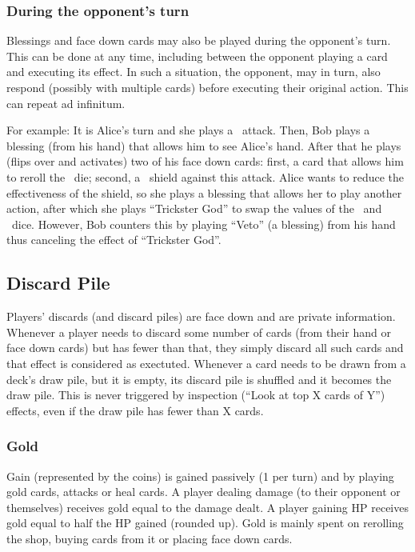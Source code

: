 \documentclass[dvipsnames,parskip,a4paper]{scrartcl}
\newcommand{\iconsize}{3.4mm}
\newcommand{\icondepth}{0.45mm}
\newcommand{\icon}[1]{\raisebox{-\icondepth}{\texttt{[image:  \#1 ]}}}
\newcommand{\fire}{\icon{icons/fire.png}}
\newcommand{\water}{\icon{icons/water.png}}
\begin{document}
\subsubsection*{During the opponent's turn}

Blessings and face down cards may also be played during the opponent's turn. This can be done at any time, including between the opponent playing a card and executing its effect. In such a situation, the opponent, may in turn, also respond (possibly with multiple cards) before executing their original action. This can repeat ad infinitum.

For example: It is Alice's turn and she plays a \fire \ attack. Then, Bob plays a blessing (from his hand) that allows him to see Alice's hand. After that he plays (flips over and activates) two of his face down cards: first, a card that allows him to reroll the \fire \ die; second, a \water \ shield against this attack. Alice wants to reduce the effectiveness of the shield, so she plays a blessing that allows her to play another action, after which she plays ``Trickster God'' to swap the values of the \fire \ and \water \ dice. However, Bob counters this by playing ``Veto'' (a blessing) from his hand thus canceling the effect of ``Trickster God''.

\subsection*{Discard Pile}

Players' discards (and discard piles) are face down and are private information. Whenever a player needs to discard some number of cards (from their hand or face down cards) but has fewer than that, they simply discard all such cards and that effect is considered as exectuted. Whenever a card needs to be drawn from a deck's draw pile, but it is empty, its discard pile is shuffled and it becomes the draw pile. This is never triggered by inspection (``Look at top X cards of Y'') effects, even if the draw pile has fewer than X cards.

\subsubsection*{Gold}

Gain (represented by the coins) is gained passively (1 per turn) and by playing gold cards, attacks or heal cards. A player dealing damage (to their opponent or themselves) receives gold equal to the damage dealt. A player gaining HP receives gold equal to half the HP gained (rounded up). Gold is mainly spent on rerolling the shop, buying cards from it or placing face down cards.
\end{document}
